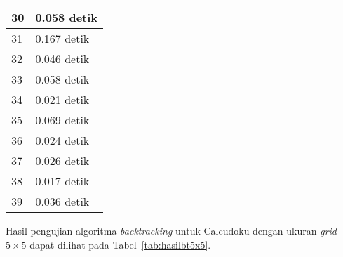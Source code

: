 \begin{table}
\begin{tabular}{| l | l |}
\hline
30 & 0.058 detik \\
\hline
31 & 0.167 detik \\
\hline
32 & 0.046 detik \\
\hline
33 & 0.058 detik \\
\hline
34 & 0.021 detik \\
\hline
35 & 0.069 detik \\
\hline
36 & 0.024 detik \\
\hline
37 & 0.026 detik \\
\hline
38 & 0.017 detik \\
\hline
39 & 0.036 detik \\
\hline
\end{tabular}
\label{tab:hasilbt4x4}
\end{table}

Hasil pengujian algoritma \textit{backtracking} untuk Calcudoku dengan ukuran \textit{grid} \begin{math}5 \times 5\end{math} dapat dilihat pada Tabel~\ref{tab:hasilbt5x5}.

